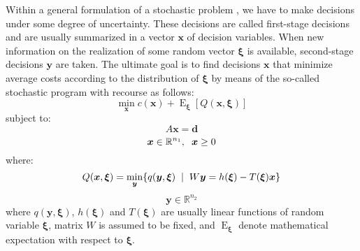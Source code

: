 Within a general formulation of a stochastic problem \citep{birge2011introduction}, we have to make decisions under some degree of uncertainty. These decisions are called first-stage decisions and are usually summarized in a vector $\boldsymbol{x}$ of decision variables. When new information on the realization
of some random vector $\boldsymbol{\xi}$ is available, second-stage decisions $\boldsymbol{y}$ are taken. The ultimate goal is to find decisions $\boldsymbol{x}$ that minimize average costs according to the distribution of $\boldsymbol{\xi}$ by means of the so-called stochastic program with recourse as follows:
\begin{equation}
\min_{\boldsymbol{x}} c(\boldsymbol{x}) + \operatorname{E}_{\boldsymbol{\xi}} \left[ Q(\boldsymbol{x},\boldsymbol{\xi}) \right]
\label{eq:sp}
\end{equation}
subject to:
\begin{equation}
A \boldsymbol{x} = \boldsymbol{d}
\end{equation}
\begin{equation}
\boldsymbol{x} \in \mathbb{R}^{n_1}, \hspace{2mm} \boldsymbol{x} \geq 0
\end{equation}
where:
\begin{equation}
Q(\boldsymbol{x},\boldsymbol{\xi}) = \min_{\boldsymbol{y}} \{q (\boldsymbol{y},\boldsymbol{\xi}) \hspace{2mm} |  \hspace{2mm} W\boldsymbol{y} = h(\boldsymbol{\xi}) - T(\boldsymbol{\xi}) \boldsymbol{x} \}
\end{equation}
\begin{equation}
\boldsymbol{y} \in \mathbb{R}^{n_2}
\label{eq:sp_end}
\end{equation}
where $q(\boldsymbol{y},\boldsymbol{\xi})$, $h(\boldsymbol{\xi})$ and  $T(\boldsymbol{\xi})$ are usually linear functions of random variable $\boldsymbol{\xi}$, matrix $W$ is assumed to be fixed, and $\operatorname{E}_{\boldsymbol{\xi}}$ denote mathematical expectation with respect to $\boldsymbol{\xi}$.

